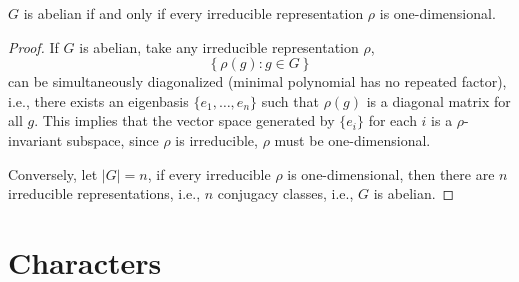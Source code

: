 \begin{prop}
    $G$ is abelian if and only if every irreducible representation $\rho$ is one-dimensional.
\end{prop}
\begin{proof}
    If $G$ is abelian, take any irreducible representation $\rho$, 
    \begin{equation*}
        \left\{\rho(g): g\in G\right\}
    \end{equation*}
    can be simultaneously diagonalized (minimal polynomial has no repeated factor), i.e., there exists an eigenbasis $\{e_1,\dots,e_n\}$ such that $\rho(g)$ is a diagonal matrix for all $g$. This implies that the vector space generated by $\{e_i\}$ for each $i$ is a $\rho$-invariant subspace, since $\rho$ is irreducible, $\rho$ must be one-dimensional. 

    Conversely, let $|G|=n$, if every irreducible $\rho$ is one-dimensional, then there are $n$ irreducible representations, i.e., $n$ conjugacy classes, i.e., $G$ is abelian.
\end{proof}

\section{Characters}

